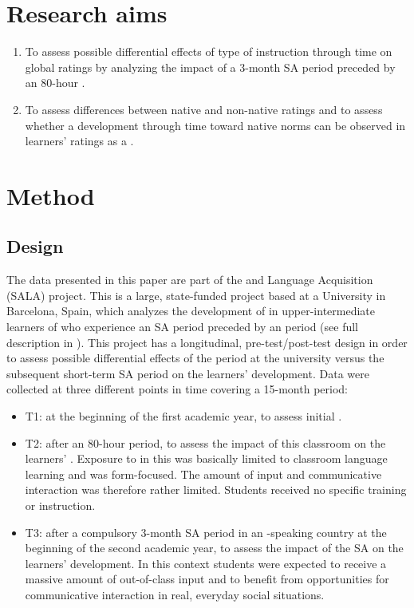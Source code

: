 \documentclass[output=paper]{langsci/langscibook}
\begin{document}
\section{Research aims}

\sloppy
\begin{enumerate}
\item To assess possible differential effects of type of instruction through time on global  ratings by analyzing the impact of a 3-month SA period preceded by an 80-hour  .
\item To assess differences between native and non-native  ratings and to assess whether a development through time toward native norms can be observed in  learners’  ratings as a .
\end{enumerate}
\fussy

\section{Method}
\subsection{Design}


The data presented in this paper are part of the  and Language Acquisition (SALA) project. This is a large, state-funded project based at a University in Barcelona, Spain, which analyzes the development of   in upper-intermediate learners of   who experience an SA period preceded by an  period (see full description in \citealt{Pérez-VidalJuan-Garau2011}). This project has a longitudinal, pre-test/post-test design in order to assess possible differential effects of the  period at the  university versus the subsequent short-term SA period on the learners’   development. Data were collected at three different points in time covering a 15-month period:

\begin{itemize}
\item T1: at the beginning of the first academic year, to assess initial  .
\item T2: after an 80-hour  period, to assess the impact of this classroom  on the learners’  . Exposure to  in this  was basically limited to classroom language learning and was form-focused. The amount of input and communicative interaction was therefore rather limited. Students received no specific  training or  instruction.
\item T3: after a compulsory 3-month SA period in an -speaking country at the beginning of the second academic year, to assess the impact of the SA  on the learners’  development. In this context students were expected to receive a massive amount of out-of-class input and to benefit from opportunities for communicative interaction in real, everyday social situations.
\end{itemize}
\end{document}
